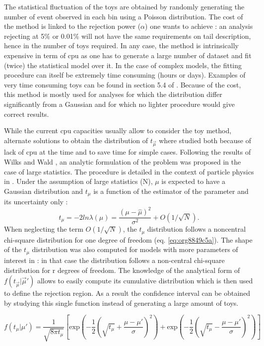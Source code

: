 The statistical fluctuation of the toys are obtained by randomly generating the number of event observed in each bin using a Poisson distribution.
The cost of the method is linked to the rejection power (\(\alpha\)) one wants to achieve : an analysis rejecting at 5\% or 0.01\% will not have the same requirements on tail description, hence in the number of toys required.
In any case, the method is intrinsically expensive in term of cpu as one has to generate a large number of dataset and fit (twice) the statistical model over it.
In the case of complex models, the fitting procedure can itself be extremely time consuming (hours or days).
Examples of very time consuming toys can be found in section 5.4 of \cite{CERN-THESIS-2015-193}.
Because of the cost, this method is mostly used for analyses for which the distribution differ significantly from a Gaussian and for which no lighter procedure would give correct results.


While the current cpu capacities usually allow to consider the toy method, alternate solutions to obtain the distribution of $t_{\vec{\mu}}$ where studied both because of lack of cpu at the time and to save time for simple cases.
Following the results of Wilks \cite{wilks1938} and Wald \cite{Wald1943}, an analytic formulation of the problem was proposed in the case of large statistics.
The procedure is detailed in the context of particle physics in \cite{Cowan:1071727}.
Under the assumption of large statistics (N), $\mu$ is expected to have a Gaussian distribution and $t_{\mu}$ is a function of the estimator of the parameter and its uncertainty only :
\begin{equation}
\label{eq:org68bb290}
t_\mu = -2ln\lambda (\mu) = \frac{(\mu - \hat{\mu})^2}{\sigma^2} + O(1/\sqrt{N}).
\end{equation}
When neglecting the term \(O(1/\sqrt{N})\), the $t_\mu$ distribution follows a noncentral chi-square distribution for one degree of freedom (eq. \ref{eq:org8849c5a}).
The shape of the $t_\mu$ distribution was also computed for models with more parameters of interest in \cite{Cowan:1071727} : in that case the distribution follows  a non-central chi-square distribution for r degrees of freedom.
The knowledge of the analytical form of \(f(t_{\vec{\mu}}|\vec{\mu}')\) allows to easily compute its cumulative distribution which is then used to define the rejection region.
As a result the confidence interval can be obtained by studying this single function instead of generating a large amount of toys.

\begin{equation}
\label{eq:org8849c5a}
 f(t_\mu | \mu' ) = \frac{1}{\sqrt{8\pi t_\mu }} \left[ \text{exp} \left( -\frac{1}{2} (\sqrt{t_\mu} + \frac{\mu - \mu'}{\sigma})^2\right)  + \text{exp}\left( -\frac{1}{2} (\sqrt{t_\mu} - \frac{\mu - \mu'}{\sigma})^2\right)\right]
\end{equation}


